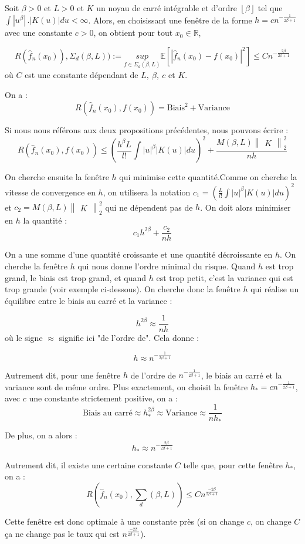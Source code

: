 \documentclass[
]{book}
\begin{document}
\begin{thm} Soit $\beta>0$ et $L>0$ et $K$ un noyau de carré intégrable et d'ordre $\left\lfloor{\beta}\right\rfloor$ tel que $\int |u^{\beta}|\,.|K(u)|du<\infty$. Alors, en choisissant une fenêtre de la forme $h=cn^{-\frac{1}{2\beta+1}}$ avec une constante $c>0$, on obtient pour tout $x_0 \in \mathbb{R}$,

$$ 
R(\hat {f}_n(x_0)),\Sigma_d(\beta, L)):= \underset{f\in\Sigma_d(\beta,L)}{sup}\mathbb{E}[|\hat {f}_n(x_0)-f(x_0)|^2]\leqslant Cn^{-\frac{2\beta}{2\beta+1}}
$$ 
 où $C$ est une constante dépendant de $L,~\beta,~ c$ et $K$.
 \end{thm}
\begin{demo}
  On a :
$$
 R(\hat {f}_n(x_0),f(x_0))= \text{Biais}^2 + \text{Variance}
$$ 

Si nous nous référons aux deux propositions précédentes, nous pouvons écrire :
$$
 R(\hat {f}_n(x_0),f(x_0))\leqslant \left(\frac{h^{\beta}L}{l!}\int |u|^{\beta}|K(u)|du\right)^2 + \frac{M(\beta,L)\begin{Vmatrix}K\end{Vmatrix}_2^2}{nh}
$$

On cherche ensuite la fenêtre $h$ qui minimise cette quantité.Comme on cherche la vitesse de convergence en $h$, on utilisera la notation $c_1=(\frac{L}{l!}\int |u|^{\beta}|K(u)|du)^2$ et $c_2=M(\beta,L)\begin{Vmatrix}K\end{Vmatrix}_2^2$ qui ne dépendent pas de $h$. On doit alors minimiser en $h$ la quantité :
$$
  c_1h^{2\beta}+\frac{c_2}{nh}
$$

On a une somme d'une quantité croissante et une quantité décroissante en $h$. On cherche la fenêtre $h$ qui nous donne l'ordre minimal du risque. Quand $h$ est trop grand, le biais est trop grand, et quand $h$ est trop petit, c'est la variance qui est trop grande (voir exemple ci-dessous). On cherche donc la fenêtre $h$ qui réalise un équilibre entre le biais au carré et la variance :

$$ 
  h^{2\beta}\approx\frac{1}{nh}
$$
où le signe $\approx$ signifie ici "de l'ordre de". Cela donne :

$$
  h\approx n^{-\frac{1}{2\beta +1}}
$$

Autrement dit, pour une fenêtre $h$ de l'ordre de $n^{-\frac{1}{2\beta+1}}$, le biais au carré et la variance sont de même ordre. Plus exactement, on choisit la fenêtre $h_*=cn^{-\frac{1}{2\beta+1}}$, avec $c$ une constante strictement positive, on a :
$$
  \text{Biais au carré} \approx h_{*}^{2\beta}\approx \text{Variance} \approx \frac{1}{nh_{*}}
$$

De plus, on a alors :
$$
  h_* \approx n^{-\frac{2\beta}{2\beta + 1}}
$$

Autrement dit, il existe une certaine constante $C$ telle que, pour cette fenêtre $h_*$, on a :
$$
  R(\hat {f}_n(x_0),\sum_d(\beta,L))\leqslant Cn^{\frac{-2\beta}{2\beta + 1}}
$$

  Cette fenêtre est donc optimale à une constante près (si on change $c$, on change $C$ ça ne change pas le taux qui est $n^{\frac{-2\beta}{2\beta+1}}$).\newline
\end{demo}
\end{document}
